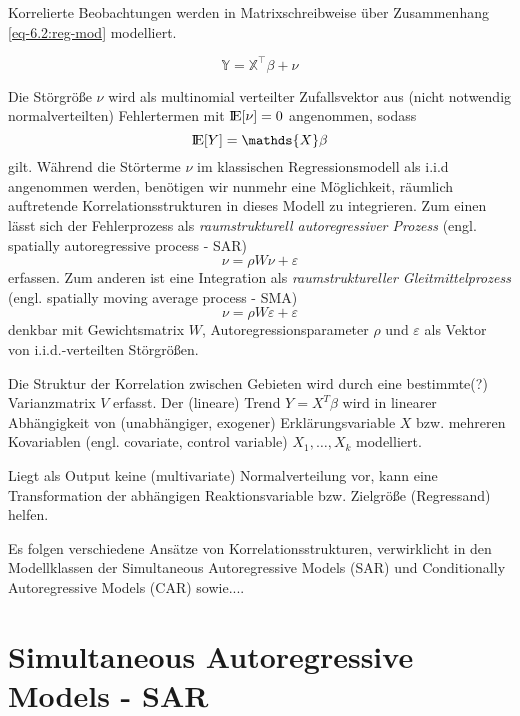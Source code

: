 Korrelierte Beobachtungen werden in Matrixschreibweise über Zusammenhang \eqref{eq-6.2:reg-mod} modelliert.

\begin{equation} \label{eq-6.2:reg-mod}
    \mathds{Y} = \mathds{X}^{\top} \beta + \nu 
\end{equation}

Die Störgröße $\nu$ wird als multinomial verteilter Zufallsvektor aus (nicht notwendig normalverteilten) Fehlertermen 
mit ${\rm I\!E}[\nu]=0$ angenommen, sodass
\begin{equation*}
    \bbbe[Y]=\mathds{X} \beta
\end{equation*}
gilt.
Während die Störterme $\nu$ im klassischen Regressionsmodell als i.i.d angenommen werden, benötigen wir nunmehr 
eine Möglichkeit, räumlich auftretende Korrelationsstrukturen in dieses Modell zu integrieren. Zum einen 
lässt sich der Fehlerprozess als \emph{raumstrukturell autoregressiver Prozess} 
(engl. spatially autoregressive process - SAR)
\begin{equation*}
    \nu = \rho W \nu + \varepsilon
\end{equation*}
erfassen. Zum anderen ist eine Integration als \emph{raumstruktureller Gleitmittelprozess} (engl. spatially 
moving average process - SMA)
\begin{equation*}
    \nu = \rho W \varepsilon + \varepsilon
\end{equation*}
denkbar mit Gewichtsmatrix $W$, Autoregressionsparameter $\rho$ und $\varepsilon$ als 
Vektor von i.i.d.-verteilten Störgrößen. 


Die Struktur der Korrelation zwischen Gebieten wird durch eine bestimmte(?) Varianzmatrix $V$ erfasst.
Der (lineare) Trend $Y = X^{T} \beta$ wird in linearer 
Abhängigkeit von (unabhängiger, exogener) Erklärungsvariable $X$ bzw. mehreren 
Kovariablen (engl. covariate, control variable) $X_1,\ldots,X_k$ modelliert.  

Liegt als Output keine (multivariate) Normalverteilung vor, kann eine Transformation der 
abhängigen Reaktionsvariable bzw. Zielgröße (Regressand) helfen. 

Es folgen verschiedene Ansätze von Korrelationsstrukturen, verwirklicht in den Modellklassen 
der Simultaneous Autoregressive Models (SAR) und Conditionally Autoregressive Models (CAR) sowie....

\section{Simultaneous Autoregressive Models - SAR}

